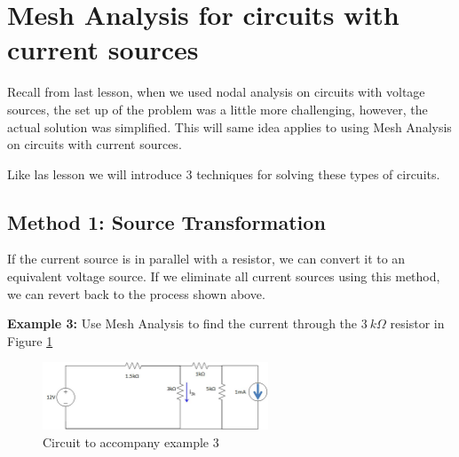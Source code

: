 \documentclass{handout}
\begin{document}
\newpage
\clearpage
\pagebreak

\section{Mesh Analysis for circuits with current sources}
Recall from last lesson, when we used nodal analysis on circuits with voltage sources, the set up of the problem was a little more challenging, however, the actual solution was simplified.  This will same idea applies to using Mesh Analysis on circuits with current sources.

Like las lesson we will introduce 3 techniques for solving these types of circuits.

\subsection{Method 1: Source Transformation}
If the current source is in parallel with a resistor, we can convert it to an equivalent voltage source.  If we eliminate all current sources using this method, we can revert back to the process shown above. 

\textbf{Example 3:} Use Mesh Analysis to find the current through the $3\ k\Omega$ resistor in Figure \ref{fig: MeshAnalysisEx3}
\begin{figure} [h t b]
\centering
\includegraphics[width=0.6\textwidth]{Example3.jpg}
\caption{Circuit to accompany example 3}
\label{fig: MeshAnalysisEx3}
\end{figure}

\end{document}
